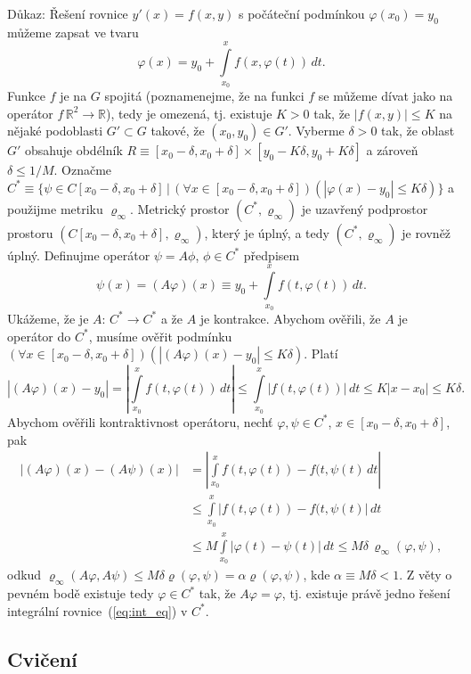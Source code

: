 Důkaz: Řešení rovnice $y'(x) = f(x,y)$ s počáteční podmínkou $\varphi(x_0)=y_0$
můžeme zapsat ve tvaru
\begin{equation}\label{eq:int_eq}
   \varphi(x) = y_0 + \int\limits_{x_0}^x f(x,\varphi(t))\,dt.
\end{equation}
Funkce $f$ je na $G$ spojitá (poznamenejme, že na funkci $f$
se můžeme dívat jako na operátor $f\,\mathbb{R}^2\rightarrow\mathbb{R}$),
tedy je omezená, tj. existuje $K>0$ tak, že $|f(x,y)|\leq K$ na nějaké
podoblasti $G'\subset G$ takové, že $(x_0,y_0)\in G'$.
Vyberme $\delta>0$ tak, že oblast $G'$ obsahuje obdélník
$R\equiv [x_0-\delta,x_0+\delta]\times [y_0-K\delta,y_0+K\delta]$
a zároveň $\delta\leq 1/M$.
Označme $C^*\equiv\{\psi\in C[x_0-\delta,x_0+\delta]\,|\,
(\forall x\in[x_0-\delta,x_0+\delta])(|\varphi(x)-y_0|\leq K\delta)\}$
a použijme metriku $\varrho_{\infty}$.
Metrický prostor $(C^*,\varrho_{\infty})$ je uzavřený podprostor prostoru
$(C[x_0-\delta,x_0+\delta],\varrho_{\infty})$, který je úplný, a tedy
$(C^*,\varrho_{\infty})$ je rovněž úplný.
Definujme operátor $\psi=A\phi$, $\phi\in C^*$ předpisem
\[
   \psi(x)=(A\varphi)(x)\equiv y_0+\int\limits_{x_0}^x f(t,\varphi(t))\,dt.
\]
Ukážeme, že je $A:\,C^*\rightarrow C^*$ a že $A$ je kontrakce.
Abychom ověřili, že $A$ je operátor do $C^*$, musíme ověřit podmínku
$(\forall x\in[x_0-\delta,x_0+\delta])(|(A\varphi)(x)-y_0|\leq K\delta)$.
Platí
\[
   |(A\varphi)(x)-y_0|=\left|\int\limits_{x_0}^xf(t,\varphi(t))\,dt\right|
                      \leq\int\limits_{x_0}^x|f(t,\varphi(t))|\,dt
                      \leq K|x-x_0|\leq K\delta.
\]
Abychom ověřili kontraktivnost operátoru, nechť $\varphi,\psi\in C^*$, 
$x\in[x_0-\delta,x_0+\delta]$, pak
\[
  \begin{split}
   |(A\varphi)(x)-(A\psi)(x)|&=
    \left|\int\limits_{x_0}^xf(t,\varphi(t))-f(t,\psi(t)\,dt\right|\\
    &\leq\int\limits_{x_0}^x|f(t,\varphi(t))-f(t,\psi(t)|\,dt\\
    &\leq M\int\limits_{x_0}^x|\varphi(t)-\psi(t)|\,dt
    \leq M\delta\,\varrho_{\infty}(\varphi,\psi),
  \end{split}
\]
odkud $\varrho_{\infty}(A\varphi,A\psi)\leq M\delta\varrho(\varphi,\psi)
=\alpha\varrho(\varphi,\psi)$, kde $\alpha\equiv M\delta<1$.
Z věty o pevném bodě existuje tedy $\varphi\in C^*$ tak, že
$A\varphi=\varphi$, tj. existuje právě jedno řešení integrální 
rovnice~(\ref{eq:int_eq}) v $C^*$.

\subsection{Cvičení}


